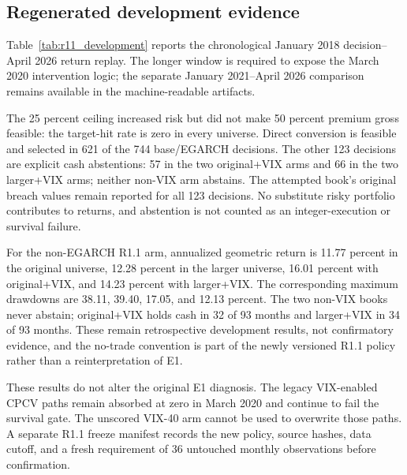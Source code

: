 \subsection{Regenerated development evidence}

Table~\ref{tab:r11_development} reports the chronological January 2018 decision--April
2026 return replay.
The longer window is required to expose the March 2020 intervention logic; the separate
January 2021--April 2026 comparison remains available in the machine-readable artifacts.

\begin{table}[H]
\centering
\caption{R1.1 chronological development replay. Target hit is the fraction of integer books
at or above 50 percent premium gross. An infeasible direct conversion produces a cash
abstention, not a substitute portfolio or an execution failure. EGARCH is diagnostic only.}
\label{tab:r11_development}
\resizebox{\textwidth}{!}{}
\end{table}

\begin{table}[H]
\centering
\caption{Whole-contract execution outcomes across the R1.1 base and EGARCH diagnostic
books. Direct truncation is selected when feasible; otherwise cash abstention is selected.}
\label{tab:r11_integer_repairs}
\resizebox{0.88\textwidth}{!}{}
\end{table}

The 25 percent ceiling increased risk but did not make 50 percent premium gross feasible:
the target-hit rate is zero in every universe. Direct conversion is feasible and selected
in 621 of the 744 base/EGARCH decisions. The other 123 decisions are explicit cash
abstentions: 57 in the two original+VIX arms and 66 in the two larger+VIX arms; neither
non-VIX arm abstains. The attempted book's original breach values remain reported for all
123 decisions. No substitute risky portfolio contributes to returns, and abstention is not
counted as an integer-execution or survival failure.

For the non-EGARCH R1.1 arm, annualized geometric return is 11.77 percent in the original
universe, 12.28 percent in the larger universe, 16.01 percent with original+VIX, and 14.23
percent with larger+VIX. The corresponding maximum drawdowns are 38.11, 39.40, 17.05, and
12.13 percent. The two non-VIX books never abstain; original+VIX holds cash in 32 of 93
months and larger+VIX in 34 of 93 months. These remain retrospective development results,
not confirmatory evidence, and the no-trade convention is part of the newly versioned
R1.1 policy rather than a reinterpretation of E1.

These results do not alter the original E1 diagnosis. The legacy VIX-enabled CPCV paths
remain absorbed at zero in March 2020 and continue to fail the survival gate. The unscored
VIX-40 arm cannot be used to overwrite those paths. A separate R1.1 freeze manifest records
the new policy, source hashes, data cutoff, and a fresh requirement of 36 untouched monthly
observations before confirmation.
